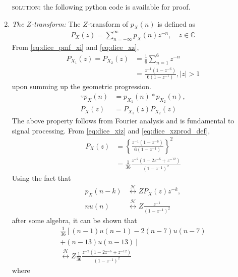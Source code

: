 \documentclass{article}
\numberwithin{equation}{subsection}
\numberwithin{figure}{subsection}
\providecommand{\cbrak}[1]{\ensuremath{\left\{#1\right\}}}
\providecommand{\brak}[1]{\ensuremath{\left(#1\right)}}
\providecommand{\lsbrak}[1]{\ensuremath{{}\left[#1\right.}}
\providecommand{\rsbrak}[1]{\ensuremath{{}\left.#1\right]}}
\providecommand{\system}{\overset{\mathcal{H}}{ \longleftrightarrow}}
\providecommand{\abs}[1]{\left\vert#1\right\vert}
\renewcommand\thesection{\arabic{section}}
\renewcommand\thesubsection{\thesection.\arabic{subsection}}
\begin{document}
\begin{enumerate}[label=\thesubsection.\arabic*.,ref=\thesubsection.\arabic{figure}]
\begin{flushleft}
 \textsc{solution:} the following python code is available for proof.
 \end{flushleft}
 \begin{center}
\end{center}
\item {\em The $Z$-transform: }
The $Z$-transform of $p_X(n)$ is defined as 
\begin{align}
P_X(z) = \sum_{n = -\infty}^{\infty}p_X(n)z^{-n}, \quad z \in \mathbb{C}
\label{eq:dice_xz}
\end{align}
%
From \eqref{eq:dice_pmf_xi} and \eqref{eq:dice_xz}, 
\begin{align}
P_{X_1}(z) =P_{X_2}(z) &= \frac{1}{6}\sum_{n = 1}^{6}z^{-n}
\\
&=\frac{z^{-1}\brak{1-z^{-6}}}{6\brak{1-z^{-1}}},  \abs{z} >1
\label{eq:dice_xiz}
\end{align}
upon summing up the geometric progression.  
\begin{align}
\because p_X(n) &= p_{X_1}(n)*p_{X_2}(n),
\\
P_X(z) &= P_{X_1}(z)P_{X_2}(z)
\label{eq:dice_xzprod_def}
\end{align}
The above property follows from Fourier analysis and is fundamental to signal processing. 
From \eqref{eq:dice_xiz} and \eqref{eq:dice_xzprod_def},
\begin{align}
P_X(z) &= \cbrak{\frac{z^{-1}\brak{1-z^{-6}}}{6\brak{1-z^{-1}}}}^2
\\
&= \frac{1}{36}\frac{z^{-2}\brak{1-2z^{-6}+z^{-12}}}{\brak{1-z^{-1}}^2}
\label{eq:dice_xzprod}
\end{align}
Using the fact that 
\begin{align}
p_X(n-k) &\system{Z}P_X(z)z^{-k},
\\
nu(n)&\system{Z} \frac{z^{-1}}{\brak{1-z^{-1}}^2}
\end{align}
after some algebra, it can be shown that
\begin{multline}
\frac{1}{36}\lsbrak{\brak{n-1}u(n-1) - 2 \brak{n-7}u(n-7)}
\\
\rsbrak{ +\brak{n-13}u(n-13)}
\\
\system{Z}
\frac{1}{36}\frac{z^{-2}\brak{1-2z^{-6}+z^{-12}}}{\brak{1-z^{-1}}^2}
\label{eq:dice_xz_closed}
\end{multline}
where 

\end{enumerate}
\end{document}
